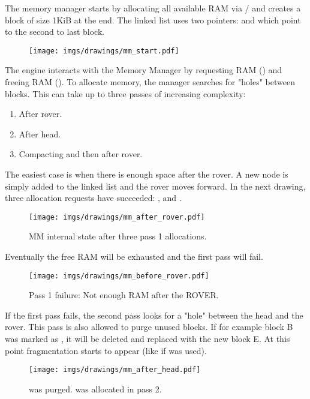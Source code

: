 \documentclass[book.tex]{subfiles}
\begin{document}
The memory manager starts by allocating all available RAM via / and creates a  block of size 1KiB at the end. The linked list uses two pointers:  and  which point to the second to last block.
 \par
\begin{figure}[H]
\centering
 \texttt{[image: imgs/drawings/mm\_start.pdf]}
 \end{figure}
 \par
 The engine interacts with the Memory Manager by requesting RAM () and freeing RAM (). To allocate memory, the manager searches for "holes" between blocks. This can take up to three passes of increasing complexity:
\begin{enumerate}
\item After rover.
\item After head.
\item Compacting and then after rover.
\end{enumerate}
\par
  The easiest case is when there is enough space after the rover. A new node is simply added to the linked list and the rover moves forward. In the next drawing, three allocation requests have succeeded: ,  and .\\
  \par
\begin{figure}[H]
\centering
 \texttt{[image: imgs/drawings/mm\_after\_rover.pdf]}
 \caption{MM internal state after three pass 1 allocations.}
 \end{figure}
 \par
Eventually the free RAM will be exhausted and the first pass will fail.
  \par
\begin{figure}[H]
\centering
 \texttt{[image: imgs/drawings/mm\_before\_rover.pdf]}
 \caption{Pass 1 failure: Not enough RAM after the ROVER.}
 \end{figure}
 \par
 If the first pass fails, the second pass looks for a "hole" between the head and the rover. This pass is also allowed to purge unused blocks. If for example block B was marked as , it will be deleted and replaced with the new block E. At this point fragmentation starts to appear (like if  was used).\\
 \begin{figure}[H]
\centering
 \texttt{[image: imgs/drawings/mm\_after\_head.pdf]}
 \caption{ was purged.  was allocated in pass 2.}
 \end{figure}
\end{document}
